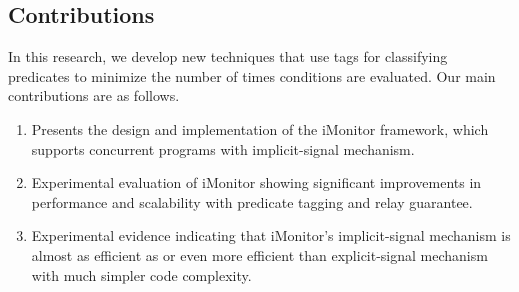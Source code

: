 \documentclass[preprint]{sigplanconf}
\begin{document}
\subsection{Contributions}
In this research, we develop new techniques that use tags for classifying 
predicates to minimize the number of times conditions are evaluated.
Our main contributions are as follows.
\begin{enumerate}
    \item Presents the design and implementation of the iMonitor framework,
        which supports concurrent programs with implicit-signal mechanism.
    \item Experimental evaluation of iMonitor showing significant
        improvements in performance and scalability with predicate tagging
        and relay guarantee. 
    \item Experimental evidence indicating that iMonitor's implicit-signal
        mechanism is almost as efficient as or even more efficient
        than explicit-signal mechanism with much simpler code complexity.
\end{enumerate}

\end{document}
